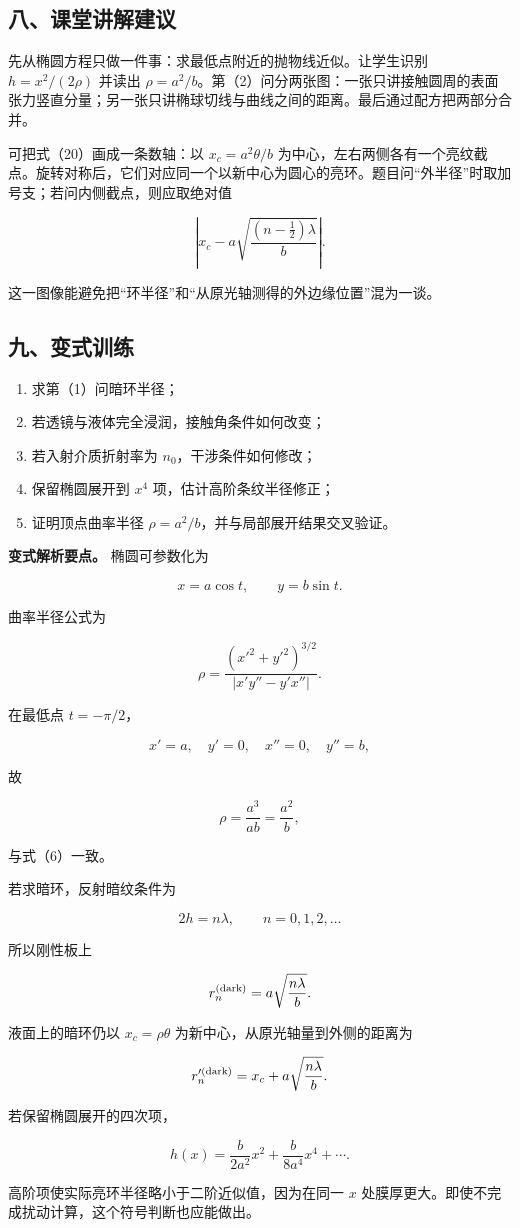 \documentclass[12pt,a4paper,UTF8]{ctexart}
\newcommand{\tightlist}{\setlength{\itemsep}{0pt}\setlength{\parskip}{0pt}}
\begin{document}
\subsection{八、课堂讲解建议}\label{ux516bux8bfeux5802ux8bb2ux89e3ux5efaux8bae-7}

先从椭圆方程只做一件事：求最低点附近的抛物线近似。让学生识别
\(h=x^2/(2\rho)\) 并读出
\(\rho=a^2/b\)。第（2）问分两张图：一张只讲接触圆周的表面张力竖直分量；另一张只讲椭球切线与曲线之间的距离。最后通过配方把两部分合并。

可把式（20）画成一条数轴：以 \(x_c=a^2\theta/b\)
为中心，左右两侧各有一个亮纹截点。旋转对称后，它们对应同一个以新中心为圆心的亮环。题目问``外半径''时取加号支；若问内侧截点，则应取绝对值

\[
\left|
x_c-a\sqrt{\frac{(n-\frac12)\lambda}{b}}
\right|.
\]

这一图像能避免把``环半径''和``从原光轴测得的外边缘位置''混为一谈。

\subsection{九、变式训练}\label{ux4e5dux53d8ux5f0fux8badux7ec3-7}

\begin{enumerate}
\def\labelenumi{\arabic{enumi}.}
\tightlist
\item
  求第（1）问暗环半径；
\item
  若透镜与液体完全浸润，接触角条件如何改变；
\item
  若入射介质折射率为 \(n_0\)，干涉条件如何修改；
\item
  保留椭圆展开到 \(x^4\) 项，估计高阶条纹半径修正；
\item
  证明顶点曲率半径 \(\rho=a^2/b\)，并与局部展开结果交叉验证。
\end{enumerate}

\textbf{变式解析要点。} 椭圆可参数化为

\[
x=a\cos t,
\qquad
y=b\sin t.
\]

曲率半径公式为

\[
\rho
=\frac{(x'^2+y'^2)^{3/2}}
{|x'y''-y'x''|}.
\]

在最低点 \(t=-\pi/2\)，

\[
x'=a,\quad y'=0,\quad x''=0,\quad y''=b,
\]

故

\[
\rho=\frac{a^3}{ab}=\frac{a^2}{b},
\]

与式（6）一致。

若求暗环，反射暗纹条件为

\[
2h=n\lambda,
\qquad n=0,1,2,\ldots
\]

所以刚性板上

\[
r_n^{(\rm dark)}
=a\sqrt{\frac{n\lambda}{b}}.
\]

液面上的暗环仍以 \(x_c=\rho\theta\) 为新中心，从原光轴量到外侧的距离为

\[
r_n^{\prime(\rm dark)}
=x_c+a\sqrt{\frac{n\lambda}{b}}.
\]

若保留椭圆展开的四次项，

\[
h(x)
=\frac{b}{2a^2}x^2
+\frac{b}{8a^4}x^4+\cdots.
\]

高阶项使实际亮环半径略小于二阶近似值，因为在同一 \(x\)
处膜厚更大。即使不完成扰动计算，这个符号判断也应能做出。
\end{document}
